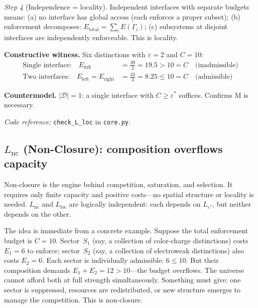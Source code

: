 \documentclass[11pt]{article}
\newcommand{\coderef}[2]{\smallskip\noindent\textit{Code reference:} \texttt{#1} in \texttt{#2}.}
\begin{document}
\begin{tcolorbox}[apfbox, title={Lemma $L_{\mathrm{loc}}$ (Locality)}]
\textit{Step 4} (Independence = locality).  Independent interfaces with separate budgets means: (a) no interface has global access (each enforces a proper subset); (b) enforcement decomposes: $E_{\mathrm{total}} = \sum_i E(\Gamma_i)$; (c) subsystems at disjoint interfaces are independently enforceable.  This is locality.

\smallskip\noindent\textbf{Constructive witness.}  Six distinctions with $\varepsilon = 2$ and $C = 10$:
\begin{align}
\text{Single interface:}\quad E_{\mathrm{full}} &= \tfrac{39}{2} = 19.5 > 10 = C \quad\text{(inadmissible)} \\
\text{Two interfaces:}\quad E_{\mathrm{left}} = E_{\mathrm{right}} &= \tfrac{33}{4} = 8.25 \le 10 = C \quad\text{(admissible)}
\end{align}

\smallskip\noindent\textbf{Countermodel.}  $|\mathcal{D}| = 1$: a single interface with $C \ge \varepsilon^*$ suffices.  Confirms M is necessary.

\coderef{check\_L\_loc}{core.py}
\end{tcolorbox}


\subsection{\texorpdfstring{$L_{\mathrm{nc}}$}{L nc} (Non-Closure): composition overflows capacity}

Non-closure is the engine behind competition, saturation, and selection.  It requires only finite capacity and positive costs---no spatial structure or locality is needed.  $L_{\mathrm{nc}}$ and $L_{\mathrm{loc}}$ are logically independent: each depends on $L_{\varepsilon^*}$, but neither depends on the other.

The idea is immediate from a concrete example.  Suppose the total enforcement budget is $C = 10$.  Sector~$S_1$ (say, a collection of color-charge distinctions) costs $E_1 = 6$ to enforce; sector~$S_2$ (say, a collection of electroweak distinctions) also costs $E_2 = 6$.  Each sector is individually admissible: $6 \le 10$.  But their composition demands $E_1 + E_2 = 12 > 10$---the budget overflows.  The universe cannot afford both at full strength simultaneously.  Something must give: one sector is suppressed, resources are redistributed, or new structure emerges to manage the competition.  This is non-closure.
\end{document}
